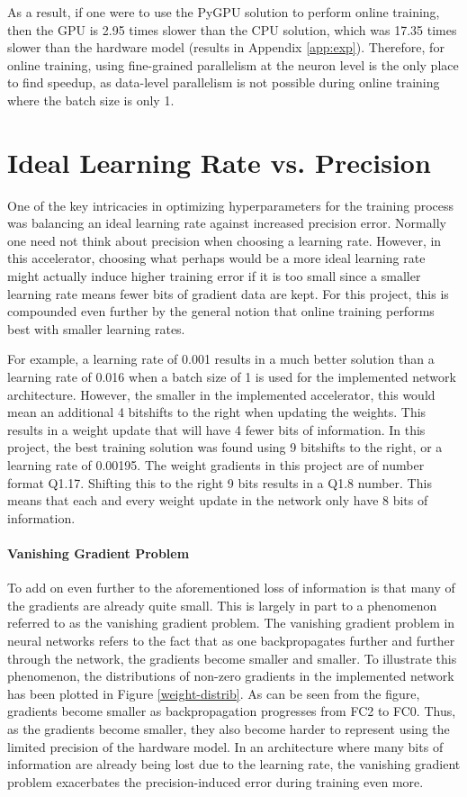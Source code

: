 As a result, if one were to use the PyGPU solution to perform online training, then the GPU is 2.95 times slower than the CPU solution, which was 17.35 times slower than the hardware model (results in Appendix \ref{app:exp}). Therefore, for online training, using fine-grained parallelism at the neuron level is the only place to find speedup, as data-level parallelism is not possible during online training where the batch size is only 1.

\section{Ideal Learning Rate vs. Precision}
One of the key intricacies in optimizing hyperparameters for the training process was balancing an ideal learning rate against increased precision error. Normally one need not think about precision when choosing a learning rate. However, in this accelerator, choosing what perhaps would be a more ideal learning rate might actually induce higher training error if it is too small since a smaller learning rate means fewer bits of gradient data are kept. For this project, this is compounded even further by the general notion that online training performs best with smaller learning rates. 

For example, a learning rate of 0.001 results in a much better solution than a learning rate of 0.016 when a batch size of 1 is used for the implemented network architecture. However, the smaller in the implemented accelerator, this would mean an additional 4 bitshifts to the right when updating the weights. This results in a weight update that will have 4 fewer bits of information. In this project, the best training solution was found using 9 bitshifts to the right, or a learning rate of 0.00195. The weight gradients in this project are of number format Q1.17. Shifting this to the right 9 bits results in a Q1.8 number. This means that each and every weight update in the network only have 8 bits of information.

\paragraph{Vanishing Gradient Problem}
To add on even further to the aforementioned loss of information is that many of the gradients are already quite small. This is largely in part to a phenomenon referred to as the vanishing gradient problem. The vanishing gradient problem in neural networks refers to the fact that as one backpropagates further and further through the network, the gradients become smaller and smaller. To illustrate this phenomenon, the distributions of non-zero gradients in the implemented network has been plotted in Figure \ref{weight-distrib}. As can be seen from the figure, gradients become smaller as backpropagation progresses from FC2 to FC0. Thus, as the gradients become smaller, they also become harder to represent using the limited precision of the hardware model. In an architecture where many bits of information are already being lost due to the learning rate, the vanishing gradient problem exacerbates the precision-induced error during training even more.


